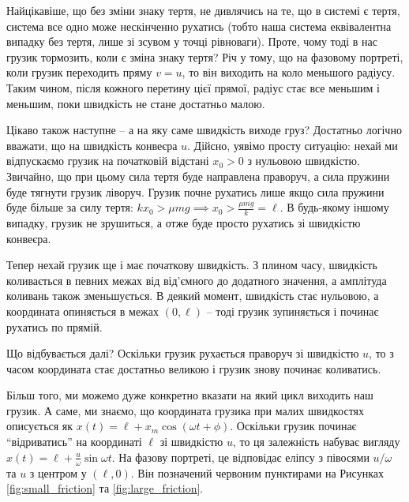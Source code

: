 \documentclass[oneside,solution]{tmpl}
\begin{document}
Найцікавіше, що без зміни знаку тертя, не дивлячись на те, що в системі є тертя, система все одно може нескінченно рухатись (тобто наша система еквівалентна випадку без тертя, лише зі зсувом у точці рівноваги). Проте, чому тоді в нас грузик тормозить, коли є зміна знаку тертя? Річ у тому, що на фазовому портреті, коли грузик переходить пряму $v=u$, то він виходить на коло меньшого радіусу. Таким чином, після кожного перетину цієї прямої, радіус стає все меньшим і меньшим, поки швидкість не стане достатньо малою.

Цікаво також наступне -- а на яку саме швидкість виходе груз? Достатньо логічно вважати, що на швидкість конвеєра $u$. Дійсно, уявімо просту ситуацію: нехай ми відпускаємо грузик на початковій відстані $x_0>0$ з нульовою швидкістю. Звичайно, що при цьому сила тертя буде направлена праворуч, а сила пружини буде тягнути грузик ліворуч. Грузик почне рухатись лише якщо сила пружини буде більше за силу тертя: $kx_0 > \mu mg \implies x_0 > \frac{\mu mg}{k} = \ell$. В будь-якому іншому випадку, грузик не зрушиться, а отже буде просто рухатись зі швидкістю конвеєра.

Тепер нехай грузик ще і має початкову швидкість. З плином часу, швидкість коливається в певних межах від від'ємного до додатного значення, а амплітуда коливань також зменьшується. В деякий момент, швидкість стає нульовою, а координата опиняється в межах $(0,\ell)$ -- тоді грузик зупиняється і починає рухатись по прямій. 

Що відбувається далі? Оскільки грузик рухається праворуч зі швидкістю $u$, то з часом координата стає достатньо великою і грузик знову починає коливатись.

Більш того, ми можемо дуже конкретно вказати на який цикл виходить наш грузик. А саме, ми знаємо, що координата грузика при малих швидкостях описується як $x(t) = \ell + x_m\cos(\omega t+\phi)$. Оскільки грузик починає ``відриватись'' на координаті $\ell$ зі швидкістю $u$, то ця залежність набуває вигляду $x(t) = \ell + \frac{u}{\omega} \sin \omega t$. На фазову портреті, це відповідає еліпсу з півосями $u/\omega$ та $u$ з центром у $(\ell, 0)$. Він позначений червоним пунктирами на Рисунках \ref{fig:small_friction} та \ref{fig:large_friction}.
\end{document}

